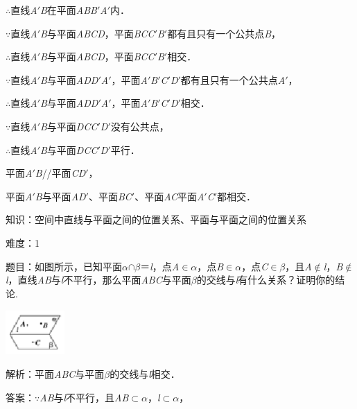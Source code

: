 \documentclass{article} %
\begin{document}
$\mathrm{\therefore}$直线\textit{A}$'$\textit{B}在平面\textit{ABB}$'$\textit{A}$'$内．

$\mathrm{\because}$直线\textit{A}$'$\textit{B}与平面\textit{ABCD}，平面\textit{BCC}$'$\textit{B}$'$都有且只有一个公共点\textit{B}，

$\mathrm{\therefore}$直线\textit{A}$'$\textit{B}与平面\textit{ABCD}，平面\textit{BCC}$'$\textit{B}$'$相交．

$\mathrm{\because}$直线\textit{A}$'$\textit{B}与平面\textit{ADD}$'$\textit{A}$'$，平面\textit{A}$'$\textit{B}$'$\textit{C}$'$\textit{D}$'$都有且只有一个公共点\textit{A}$'$，

$\mathrm{\therefore}$直线\textit{A}$'$\textit{B}与平面\textit{ADD}$'$\textit{A}$'$，平面\textit{A}$'$\textit{B}$'$\textit{C}$'$\textit{D}$'$相交．

$\mathrm{\because}$直线\textit{A}$'$\textit{B}与平面\textit{DCC}$'$\textit{D}$'$没有公共点，

$\mathrm{\therefore}$直线\textit{A}$'$\textit{B}与平面\textit{DCC}$'$\textit{D}$'$平行．

平面\textit{A}$'$\textit{B}//平面\textit{CD}$'$，

平面\textit{A}$'$\textit{B}与平面\textit{AD}$'$、平面\textit{BC}$'$、平面\textit{AC}平面\textit{A}$'$\textit{C}$'$都相交．

知识：空间中直线与平面之间的位置关系、平面与平面之间的位置关系

难度：1

题目：如图所示，已知平面\textit{$\alpha$}$\mathrm{\cap}$\textit{$\beta$}＝\textit{l}，点\textit{A}$\mathrm{\in}$\textit{$\alpha$}，点\textit{B}$\mathrm{\in}$\textit{$\alpha$}，点\textit{C}$\mathrm{\in}$\textit{$\beta$}，且\textit{A}$\mathrm{\notin}$\textit{l}，\textit{B}$\mathrm{\notin}$\textit{l}，直线\textit{AB}与\textit{l}不平行，那么平面\textit{ABC}与平面\textit{$\beta$}的交线与\textit{l}有什么关系？证明你的结论.

\includegraphics*[width=0.89in, height=0.67in, keepaspectratio=false]{image123}

解析：平面\textit{ABC}与平面\textit{$\beta$}的交线与\textit{l}相交．

答案：$\mathrm{\because}$\textit{AB}与\textit{l}不平行，且\textit{AB}$\mathrm{\subset }$\textit{$\alpha$}，\textit{l}$\mathrm{\subset }$\textit{$\alpha$}，
\end{document}
